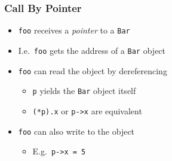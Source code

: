 \begin{frame}
  \frametitle{Call By Pointer}
  \begin{itemize}
    \item {\tt foo} receives a \emph{pointer} to a {\tt Bar}
    \item I.e.~{\tt foo} gets the address of a {\tt Bar} object
    \item {\tt foo} can read the object by dereferencing
          \begin{itemize}
            \item {\tt *p} yields the {\tt Bar} object itself
            \item {\tt (*p).x} or {\tt p->x} are equivalent
          \end{itemize}
    \item {\tt foo} can also write to the object
          \begin{itemize}
            \item E.g.~{\tt p->x = 5}
          \end{itemize}
  \end{itemize}
\end{frame}

